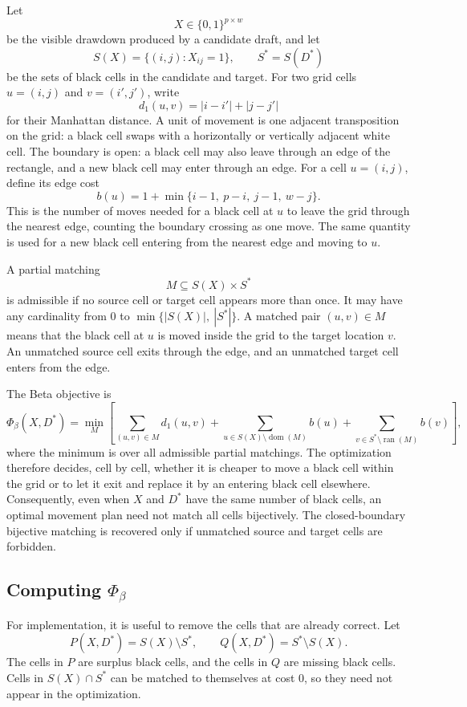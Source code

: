 \documentclass[11pt]{article}
\begin{document}
Let
\[
  X\in\{0,1\}^{p\times w}
\]
be the visible drawdown produced by a candidate draft, and let
\[
  S(X)=\{(i,j):X_{ij}=1\},
  \qquad
  S^\ast=S(D^\ast)
\]
be the sets of black cells in the candidate and target. For two grid cells
\(u=(i,j)\) and \(v=(i',j')\), write
\[
  d_1(u,v)=|i-i'|+|j-j'|
\]
for their Manhattan distance. A unit of movement is one adjacent transposition
on the grid: a black cell swaps with a horizontally or vertically adjacent
white cell. The boundary is open: a black cell may also leave through an edge
of the rectangle, and a new black cell may enter through an edge. For a cell
\(u=(i,j)\), define its edge cost
\[
  b(u)
  =
  1+\min\{i-1,\ p-i,\ j-1,\ w-j\}.
\]
This is the number of moves needed for a black cell at \(u\) to leave the grid
through the nearest edge, counting the boundary crossing as one move. The same
quantity is used for a new black cell entering from the nearest edge and moving
to \(u\).

A partial matching
\[
  M\subseteq S(X)\times S^\ast
\]
is admissible if no source cell or target cell appears more than once. It may
have any cardinality from \(0\) to \(\min\{|S(X)|,\ |S^\ast|\}\). A matched
pair \((u,v)\in M\) means that the black cell at \(u\) is moved inside the grid
to the target location \(v\). An unmatched source cell exits through the edge,
and an unmatched target cell enters from the edge.

The Beta objective is
\[
  \Phi_\beta(X,D^\ast)
  =
  \min_M
  \left[
    \sum_{(u,v)\in M}d_1(u,v)
    +
    \sum_{u\in S(X)\setminus \operatorname{dom}(M)} b(u)
    +
    \sum_{v\in S^\ast\setminus \operatorname{ran}(M)} b(v)
  \right],
\]
where the minimum is over all admissible partial matchings. The optimization
therefore decides, cell by cell, whether it is cheaper to move a black cell
within the grid or to let it exit and replace it by an entering black cell
elsewhere. Consequently, even when \(X\) and \(D^\ast\) have the same number of
black cells, an optimal movement plan need not match all cells bijectively. The
closed-boundary bijective matching is recovered only if unmatched source and
target cells are forbidden.

\subsection*{Computing \(\Phi_\beta\)}

For implementation, it is useful to remove the cells that are already correct.
Let
\[
  P(X,D^\ast)=S(X)\setminus S^\ast,
  \qquad
  Q(X,D^\ast)=S^\ast\setminus S(X).
\]
The cells in \(P\) are surplus black cells, and the cells in \(Q\) are missing
black cells. Cells in \(S(X)\cap S^\ast\) can be matched to themselves at cost
\(0\), so they need not appear in the optimization.
\end{document}

